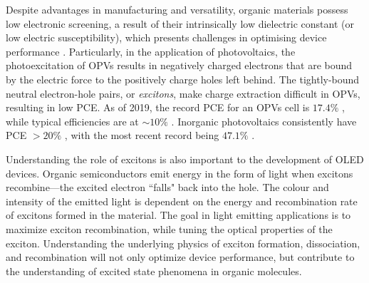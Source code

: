 Despite advantages in manufacturing and versatility, organic materials possess low electronic screening, a result of their intrinsically low dielectric constant (or low electric susceptibility), which presents challenges in optimising device performance \citep{gregg2003comparing}. Particularly, in the application of photovoltaics, the photoexcitation of \acp{OPV} results in negatively charged electrons that are bound by the electric force to the positively charge holes left behind. The tightly-bound neutral electron-hole pairs, or \emph{excitons}, make charge extraction difficult in \acp{OPV}, resulting in low \ac{PCE}. As of 2019, the record \ac{PCE} for an \acp{OPV} cell is $17.4\%$ \citep{Meng2018,Cui2019}, while typical efficiencies are at $\sim 10\%$ \citep{NREL2019champion}. Inorganic photovoltaics consistently have \ac{PCE} $> 20\%$ \citep{NREL2019research}, with the most recent record being $47.1\%$ \citep{Geisz2018}.


Understanding the role of excitons is also important to the development of \ac{OLED} devices. Organic semiconductors emit energy in the form of light when excitons recombine---the excited electron ``falls" back into the hole. The colour and intensity of the emitted light is dependent on the energy and recombination rate of excitons formed in the material. The goal in light emitting applications is to maximize exciton recombination, while tuning the optical properties of the exciton. Understanding the underlying physics of exciton formation, dissociation, and recombination will not only optimize device performance, but contribute to the understanding of excited state phenomena in organic molecules.






